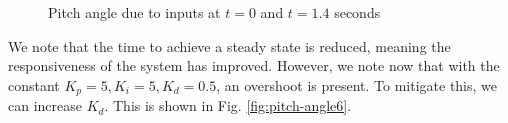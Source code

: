 \documentclass[12pt]{article}
\begin{document}
\begin{figure}[ht]
\begin{subfigure}{.4\textwidth}
    \end{subfigure}
    \caption{Pitch angle due to inputs at $t = 0$ and $t = 1.4$ seconds}
    \label{fig:pitch-angle5}
\end{figure}

We note that the time to achieve a steady state is reduced, meaning the responsiveness of the system has improved. However, we note now that with the constant $K_p = 5, K_i = 5, K_d=0.5$, an overshoot is present. To mitigate this, we can increase $K_d$. This is shown in Fig. \ref{fig:pitch-angle6}.
\end{document}
